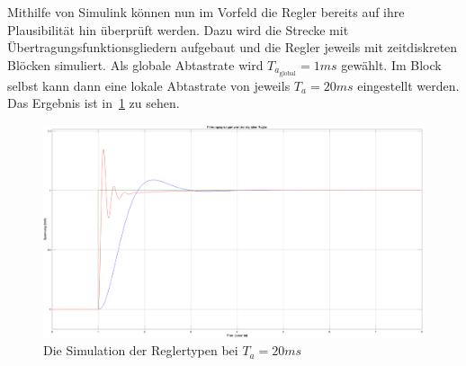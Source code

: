 \documentclass{report}
\begin{document}
Mithilfe von Simulink können nun im Vorfeld die Regler bereits auf ihre Plausibilität hin überprüft werden. Dazu wird die Strecke mit Übertragungsfunktionsgliedern aufgebaut und die Regler jeweils mit zeitdiskreten Blöcken simuliert. Als globale Abtastrate wird $T_{a_{\mathrm{global}}} = 1ms$ gewählt. Im Block selbst kann dann eine lokale Abtastrate von jeweils $T_{a} = 20ms$ eingestellt werden. Das Ergebnis ist in~\ref{fig:sim-i-pi} zu sehen.

\begin{figure}[!ht]
  \centering
  \includegraphics[width=\textwidth]{./assets/img/sim_i_pi.png}
  \caption{Die Simulation der Reglertypen bei $T_a = 20ms$ }
  \label{fig:sim-i-pi}
\end{figure}
\end{document}
